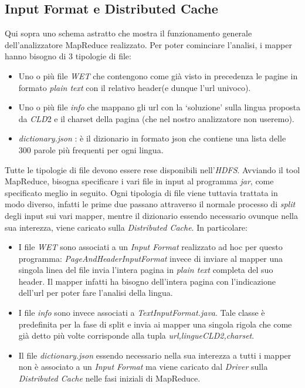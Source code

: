 \documentclass{article}
\newcommand{\MR}{MapReduce}
\newcommand{\cld}{\textit{CLD}2}
\newcommand{\DC}{\textit{Distributed Cache}}
\newcommand{\pt}{\textit{plain text}}
\newcommand{\filename}[1]{\textit{#1}}
\newcommand{\class}[1]{\textit{#1}}
\begin{document}
\subsection{Input Format e Distributed Cache}
Qui sopra uno schema astratto che mostra il funzionamento generale dell'analizzatore \MR{} realizzato. Per poter cominciare l'analisi, i mapper hanno bisogno di 3 tipologie di file: 
\begin{itemize}
    \item Uno o più file \textit{WET} che contengono come già visto in precedenza le pagine in formato \pt{} con il relativo header(e dunque l'url univoco).
    \item Uno o più file \textit{info} che mappano gli url con la `soluzione' sulla lingua proposta da \cld{} e il charset della pagina (che nel nostro analizzatore non useremo).
    \item \filename{dictionary.json} : è il dizionario in formato json che contiene una lista delle 300 parole più frequenti per ogni lingua.
\end{itemize}
Tutte le tipologie di file devono essere rese disponibili nell'\textit{HDFS}. Avviando il tool \MR{}, bisogna specificare i vari file in input al programma \textit{jar}, come specificato meglio in seguito. Ogni tipologia di file viene tuttavia trattata in modo diverso, infatti le prime due passano attraverso il normale processo di \textit{split} degli input sui vari mapper, mentre il dizionario essendo necessario ovunque nella sua interezza, viene caricato sulla \DC{}. In particolare:
\begin{itemize}
    \item I file \textit{WET} sono associati a un \textit{Input Format} realizzato ad hoc per questo programma: \class{PageAndHeaderInputFormat} invece di inviare al mapper una singola linea del file invia l'intera pagina in \pt{} completa del suo header. Il mapper infatti ha bisogno dell'intera pagina con l'indicazione dell'url per poter fare l'analisi della lingua.
    \item I file \textit{info} sono invece associati a \filename{TextInputFormat.java}. Tale classe è predefinita per la fase di split e invia ai mapper una singola rigola che come già detto più volte corrisponde alla tupla \textit{\textlangle url,lingue\cld{},charset\textrangle}.
    \item Il file \filename{dictionary.json} essendo necessario nella sua interezza a tutti i mapper non è associato a un \textit{Input Format} ma viene caricato dal \filename{Driver} sulla \DC{} nelle fasi iniziali di \MR{}.
\end{itemize}
\end{document}
